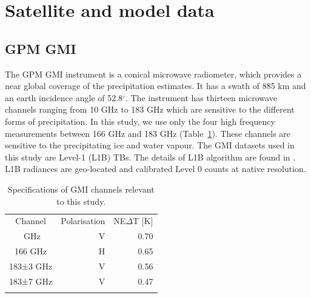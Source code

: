 \documentclass[amt, manuscript]{copernicus}
\begin{document}
\section{Satellite and model data}
\label{sec:data}
\subsection{GPM GMI}

The GPM GMI instrument is a conical microwave radiometer, which provides a near global coverage of the precipitation estimates. It has a swath of 885\,\,km  and an earth incidence angle of 52.8$^{\circ}$. The instrument has thirteen microwave channels ranging from 10\,\,GHz to 183\,\,GHz which are sensitive to the different forms of precipitation. In this study, we use only the four high frequency measurements between 166 GHz and 183 GHz (Table~\ref{tab:gmi_channels}). These channels are sensitive to the precipitating ice and water vapour. The GMI datasets used in this study are Level-1 (L1B) TBs. The details of L1B algorithm are found in \citet{}. L1B radiances are geo-located and calibrated Level 0 counts at native resolution. 

\begin{table}[t]
	\caption{Specifications of GMI channels relevant to this study.}
	\label{tab:gmi_channels}	
	\begin{tabular}{crr}
		\tophline
		Channel  & Polarisation 	& NE$\Delta$T  [K]\\
		\middlehline
			166\,\,GHz  		  & V		& 0.70	\\
			166\,\,GHz   		  & H 		& 0.65 \\
			183±3\,\,GHz         & V 	    & 0.56 \\
		    183±7\,\,GHz         & V 		& 0.47 \\
		\bottomhline
	\end{tabular}
\end{table}



\end{document}

